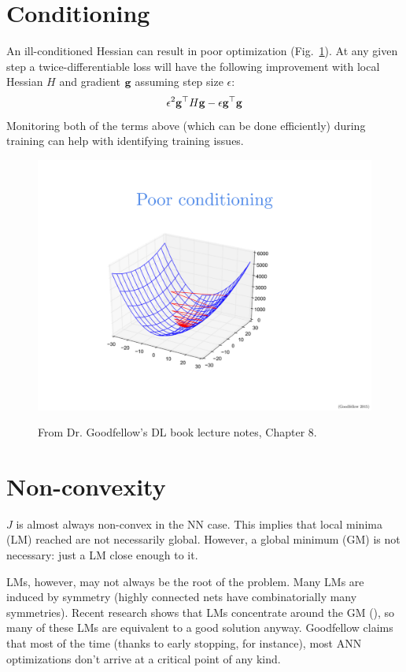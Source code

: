 \documentclass{article}
\begin{document}
\section{Conditioning}

An ill-conditioned Hessian can result in poor optimization (Fig.~\ref{fig:illcond}). At any given step a twice-differentiable loss will have the following improvement with local Hessian $H$ and gradient $\textbf{g}$ assuming step size $\epsilon$:
$$
\epsilon^2 \textbf{g}^\top H\textbf{g}-\epsilon \textbf{g}^\top\textbf{g}
$$
Monitoring both of the terms above (which can be done efficiently) during training can help with identifying training issues.

\begin{figure}[!h]
\centering
{\includegraphics[width=\textwidth]{ill-condition.pdf}}
\caption{From Dr. Goodfellow's DL book lecture notes, Chapter 8.}
\label{fig:illcond}
\end{figure}

\section{Non-convexity}

$J$ is almost always non-convex in the NN case. This implies that local minima (LM) reached are not necessarily global. However, a global minimum (GM) is not necessary: just a LM close enough to it.

LMs, however, may not always be the root of the problem. Many LMs are induced by symmetry (highly connected nets have combinatorially many symmetries). Recent research shows that LMs concentrate around the GM (), so many of these LMs are equivalent to a good solution anyway. Goodfellow claims that most of the time (thanks to early stopping, for instance), most ANN optimizations don't arrive at a critical point of any kind.
\end{document}
